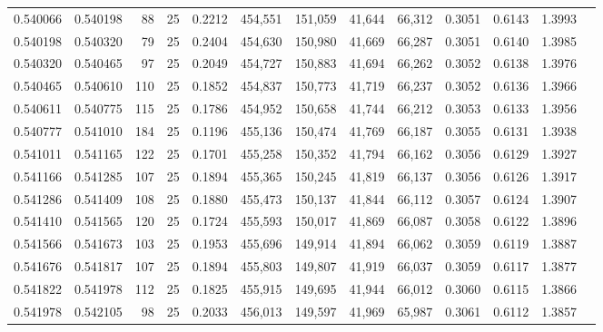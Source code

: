 \begin{tabular}{rrrrrrrrrrrrr}
0.540066 & 0.540198 &    88 &  25 &                                     0.2212 & 454,551 & 151,059 &  41,644 &  66,312 & 0.3051 & 0.6143 & 1.3993 \\
0.540198 & 0.540320 &    79 &  25 &                                     0.2404 & 454,630 & 150,980 &  41,669 &  66,287 & 0.3051 & 0.6140 & 1.3985 \\
0.540320 & 0.540465 &    97 &  25 &                                     0.2049 & 454,727 & 150,883 &  41,694 &  66,262 & 0.3052 & 0.6138 & 1.3976 \\
0.540465 & 0.540610 &   110 &  25 &                                     0.1852 & 454,837 & 150,773 &  41,719 &  66,237 & 0.3052 & 0.6136 & 1.3966 \\
0.540611 & 0.540775 &   115 &  25 &                                     0.1786 & 454,952 & 150,658 &  41,744 &  66,212 & 0.3053 & 0.6133 & 1.3956 \\
0.540777 & 0.541010 &   184 &  25 &                                     0.1196 & 455,136 & 150,474 &  41,769 &  66,187 & 0.3055 & 0.6131 & 1.3938 \\
0.541011 & 0.541165 &   122 &  25 &                                     0.1701 & 455,258 & 150,352 &  41,794 &  66,162 & 0.3056 & 0.6129 & 1.3927 \\
0.541166 & 0.541285 &   107 &  25 &                                     0.1894 & 455,365 & 150,245 &  41,819 &  66,137 & 0.3056 & 0.6126 & 1.3917 \\
0.541286 & 0.541409 &   108 &  25 &                                     0.1880 & 455,473 & 150,137 &  41,844 &  66,112 & 0.3057 & 0.6124 & 1.3907 \\
0.541410 & 0.541565 &   120 &  25 &                                     0.1724 & 455,593 & 150,017 &  41,869 &  66,087 & 0.3058 & 0.6122 & 1.3896 \\
0.541566 & 0.541673 &   103 &  25 &                                     0.1953 & 455,696 & 149,914 &  41,894 &  66,062 & 0.3059 & 0.6119 & 1.3887 \\
0.541676 & 0.541817 &   107 &  25 &                                     0.1894 & 455,803 & 149,807 &  41,919 &  66,037 & 0.3059 & 0.6117 & 1.3877 \\
0.541822 & 0.541978 &   112 &  25 &                                     0.1825 & 455,915 & 149,695 &  41,944 &  66,012 & 0.3060 & 0.6115 & 1.3866 \\
0.541978 & 0.542105 &    98 &  25 &                                     0.2033 & 456,013 & 149,597 &  41,969 &  65,987 & 0.3061 & 0.6112 & 1.3857 \\

\end{tabular}

